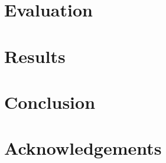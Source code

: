 \documentclass[letterpaper,twocolumn,10pt]{article}
\begin{document}


\section{Evaluation} \label{Evaluation}


\section{Results} \label{Results}


\section{Conclusion} \label{Conclusion}


\section{Acknowledgements} \label{Acknowledgements}





\end{document}
